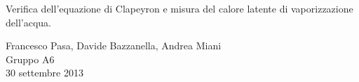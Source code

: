 \begin{center}

	\vspace{0.5cm}
     	{\huge Verifica dell'equazione di Clapeyron e misura del calore latente di vaporizzazione dell'acqua.}
	\vspace{0.5cm}

      	{\large Francesco Pasa, Davide Bazzanella, Andrea Miani} \\
		{\large Gruppo A6} \\
	
	\vspace{0.2cm}
      	{\large 30 settembre 2013}
    
    \vspace{0.7cm}

\end{center}
